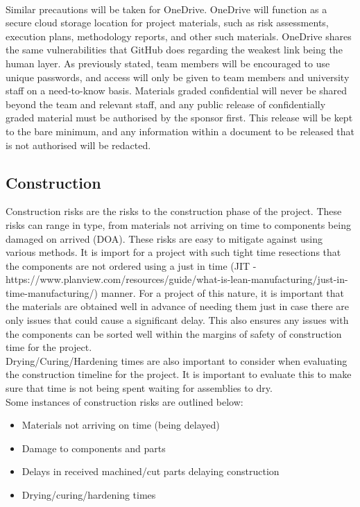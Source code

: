 \documentclass [12pt]{article}
\begin{document}
\\
Similar precautions will be taken for OneDrive. OneDrive will function as a secure cloud storage location for project materials, such as risk assessments, execution plans, methodology reports, and other such materials. OneDrive shares the same vulnerabilities that GitHub does regarding the weakest link being the human layer. As previously stated, team members will be encouraged to use unique passwords, and access will only be given to team members and university staff on a need-to-know basis.
Materials graded confidential will never be shared beyond the team and relevant staff, and any public release of confidentially graded material must be authorised by the sponsor first. This release will be kept to the bare minimum, and any information within a document to be released that is not authorised will be redacted.

\subsection{Construction}\label{sec:Construction_Risk}

Construction risks are the risks to the construction phase of the project. These risks can range in type, from materials not arriving on time to components being damaged on arrived (DOA). These risks are easy to mitigate against using various methods. It is import for a project with such tight time resections that the components are not ordered using a just in time (JIT - https://www.planview.com/resources/guide/what-is-lean-manufacturing/just-in-time-manufacturing/) manner. For a project of this nature, it is important that the materials are obtained well in advance of needing them just in case there are only issues that could cause a significant delay. This also ensures any issues with the components can be sorted well within the margins of safety of construction time for the project.
\\
Drying/Curing/Hardening times are also important to consider when evaluating the construction timeline for the project. It is important to evaluate this to make sure that time is not being spent waiting for assemblies to dry.
\\
Some instances of construction risks are outlined below:

\begin{itemize}
    \item Materials not arriving on time (being delayed)
    \item Damage to components and parts
    \item Delays in received machined/cut parts delaying construction
    \item Drying/curing/hardening times
\end{itemize}
\end{document}
